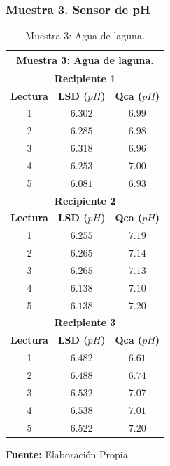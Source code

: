 \subsubsection{Muestra 3. Sensor de pH}
  \begin{table}[H]
        \protect\caption[Muestra 3: Agua de laguna]{Muestra 3: Agua de laguna.}
        \label{tab:TMuestra3}
        \centering
        \begin{tabular}{|c|c|c|}
            \hline
            \multicolumn{3}{|c|}{\textbf{Muestra 3: Agua de laguna.}} \\
             \hline
            \multicolumn{3}{|c|}{\textbf{Recipiente 1}} \\
            \hline
            \textbf{Lectura}&\textbf{LSD ($pH$)}&\textbf{Qca ($pH$)} \\
            \hline
            {1}& $6.302$&$6.99$ \\ 
            \hline
            {2}& $6.285$&$6.98$ \\ 
            \hline
            {3}& $6.318$&$6.96$\\  
            \hline
            {4}& $6.253$&$7.00$\\ 
            \hline
            {5}& $6.081$&$6.93$ \\
            \hline
            \multicolumn{3}{|c|}{\textbf{Recipiente 2}} \\
            \hline
            \textbf{Lectura}&\textbf{LSD ($pH$)}&\textbf{Qca ($pH$)} \\
            \hline
            {1}& $6.255$&$7.19$ \\ 
            \hline
            {2}& $6.265$&$7.14$ \\ 
            \hline
            {3}& $6.265$&$7.13$\\  
            \hline
            {4}& $6.138$&$7.10$\\ 
            \hline
            {5}& $6.138$&$7.20$ \\
            \hline
            \multicolumn{3}{|c|}{\textbf{Recipiente 3}} \\
            \hline
            \textbf{Lectura}&\textbf{LSD ($pH$)}&\textbf{Qca ($pH$)} \\
            \hline
            {1}& $6.482$&$6.61$ \\ 
            \hline
            {2}& $6.488$&$6.74$ \\ 
            \hline
             {3}&$6.532$&$7.07$\\  
            \hline
            {4}& $6.538$&$7.01$\\ 
            \hline
            {5}& $6.522$&$7.20$ \\
            \hline
        \end{tabular}
        \vspace{5mm}
        \newline
        \hfill \textbf{Fuente: }Elaboración Propia.
    \end{table}

